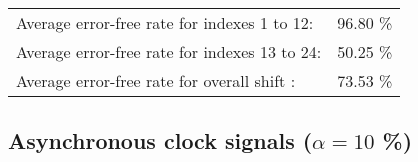 \begin{table}[h]
\begin{center}
\begin{tabular}{|c|c|c|c|c|}
\end{tabular}


\flushleft
\begin{tabular}{l l}
Average error-free rate for indexes  1 to 12: & 96.80 \% \\
Average error-free rate for indexes 13 to 24: & 50.25 \% \\
Average error-free rate for overall shift   : & 73.53 \% \\

\end{tabular}


\end{center}
\end{table}




\pagebreak
\subsection{Asynchronous clock signals ($\alpha=10$ \%)}

